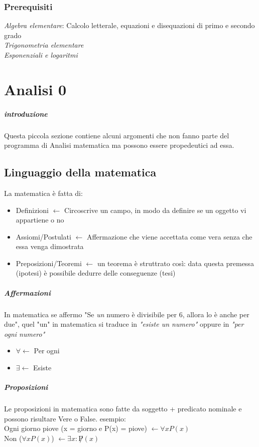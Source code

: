 \documentclass[12pt, a4paper, openany]{book}
\begin{document}
\subsection*{Prerequisiti}
\emph{Algebra elementare}: Calcolo letterale, equazioni e disequazioni di primo e secondo grado
\\\emph{Trigonometria elementare}
\\\emph{Esponenziali e logaritmi}

\chapter{Analisi 0}
\paragraph{introduzione}
Questa piccola sezione contiene alcuni argomenti che non fanno parte del programma di Analisi matematica ma possono essere propedeutici ad essa.
\section{Linguaggio della matematica }
La matematica è fatta di:
\begin{itemize}
    \item Definizioni $\leftarrow$ Circoscrive un campo, in modo da definire se un oggetto vi appartiene o no
    \item Assiomi/Postulati $\leftarrow$  Affermazione che viene accettata come vera senza che essa venga dimostrata
    \item Preposizioni/Teoremi $\leftarrow$  un teorema è struttrato così: data questa premessa (ipotesi) è possibile dedurre delle conseguenze (tesi)
\end{itemize}
\paragraph*{Affermazioni} In matematica se affermo "Se \emph{un} numero è divisibile per 6, allora lo è anche per due", quel "un" in matematica si traduce in \emph{"esiste un numero"} oppure in \emph{"per ogni numero"} 
\begin{itemize}
    \item $\forall \leftarrow$ Per ogni
    \item $\exists \leftarrow$ Esiste
\end{itemize}

\paragraph*{Proposizioni}
Le proposizioni in matematica sono fatte da soggetto + predicato nominale e possono risultare Vere o False.
esempio: 
\\Ogni giorno piove (x = giorno e P(x) = piove) $\leftarrow \forall x P(x)$
\\Non ($\forall x P(x)$) $\leftarrow \exists x : \not P(x)$
\end{document}

